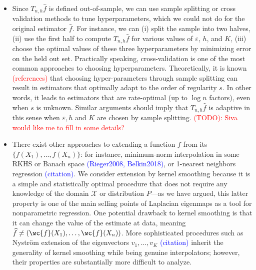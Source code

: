 \documentclass{article}
\newcommand{\Reals}{\mathbb{R}}
\newcommand{\1}{\mathbf{1}}
\newcommand{\mc}[1]{\mathcal{#1}}
\newcommand{\wh}[1]{\widehat{#1}}
\theoremstyle{alden}
\theoremstyle{aldenthm}
\theoremstyle{definition}
\theoremstyle{remark}
\begin{document}
\begin{itemize}
	\item Since $T_{n,h}\wh{f}$ is defined out-of-sample, we can use sample splitting or cross validation methods to tune hyperparameters, which we could not do for the original estimator $\wh{f}$. For instance, we can (i) split the sample into two halves, (ii) use the first half to compute $T_{n,h}\wh{f}$ for various values of $\varepsilon$, $h$, and $K$, (iii) choose the optimal values of these three hyperparameters by minimizing error on the held out set. Practically speaking, cross-validation is one of the most common approaches to choosing hyperparameters. Theoretically, it is known \textcolor{red}{(references)} that choosing hyper-parameters through sample splitting can result in estimators that optimally adapt to the order of regularity $s$. In other words, it leads to estimators that are rate-optimal (up to $\log n$ factors), even when $s$ is unknown. Similar arguments should imply that $T_{n,h}\wh{f}$ is adaptive in this sense when $\varepsilon,h$ and $K$ are chosen by sample splitting. \textcolor{red}{(TODO): Siva would like me to fill in some details?}
	\item There exist other approaches to extending a function $f$ from its $\{f(X_1),\ldots,f(X_n)\}$: for instance, minimum-norm interpolation in some RKHS or Banach space \textcolor{blue}{(Rieger2008, Belkin2018)}, or 1-nearest neighbors regression \textcolor{blue}{(citation)}.  We consider extension by kernel smoothing because it is a simple and statistically optimal procedure that does not require any knowledge of the domain $\mc{X}$ or distribution $P$---as we have argued, this latter property is one of the main selling points of Laplacian eigenmaps as a tool for nonparametric regression. One potential drawback to kernel smoothing is that it can change the value of the estimate at data, meaning $\wh{f} \neq (\wc{f}(X_1),\ldots, \wc{f}(X_n))$. More sophisticated procedures such as Nystr\"{o}m extension of the eigenvectors $v_1,\ldots,v_K$ \textcolor{blue}{(citation)} inherit the generality of kernel smoothing while being genuine interpolators; however, their properties are substantially more difficult to analyze. 
	
\end{itemize}
\end{document}
